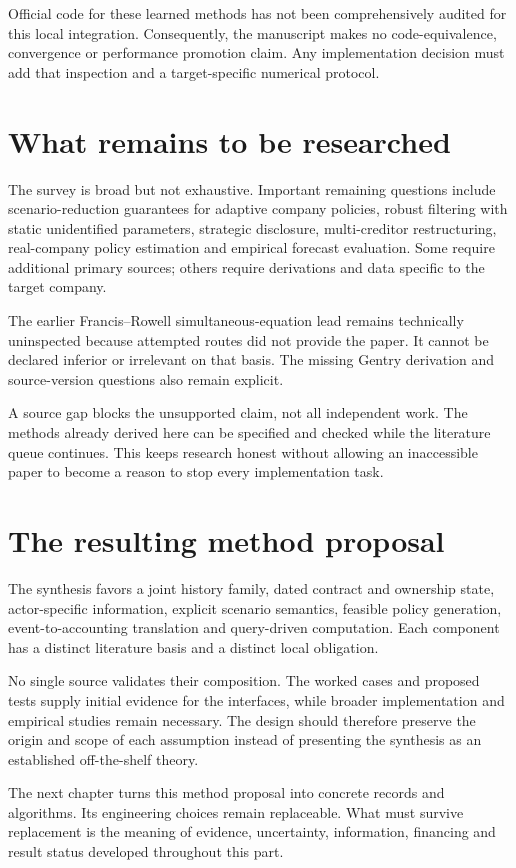 Official code for these learned methods has not been comprehensively audited for this local integration. Consequently, the manuscript makes no code-equivalence, convergence or performance promotion claim. Any implementation decision must add that inspection and a target-specific numerical protocol.



\section{What remains to be researched}
The survey is broad but not exhaustive. Important remaining questions include scenario-reduction guarantees for adaptive company policies, robust filtering with static unidentified parameters, strategic disclosure, multi-creditor restructuring, real-company policy estimation and empirical forecast evaluation. Some require additional primary sources; others require derivations and data specific to the target company.

The earlier Francis--Rowell simultaneous-equation lead remains technically uninspected because attempted routes did not provide the paper. It cannot be declared inferior or irrelevant on that basis. The missing Gentry derivation and source-version questions also remain explicit.

A source gap blocks the unsupported claim, not all independent work. The methods already derived here can be specified and checked while the literature queue continues. This keeps research honest without allowing an inaccessible paper to become a reason to stop every implementation task.

\section{The resulting method proposal}
The synthesis favors a joint history family, dated contract and ownership state, actor-specific information, explicit scenario semantics, feasible policy generation, event-to-accounting translation and query-driven computation. Each component has a distinct literature basis and a distinct local obligation.

No single source validates their composition. The worked cases and proposed tests supply initial evidence for the interfaces, while broader implementation and empirical studies remain necessary. The design should therefore preserve the origin and scope of each assumption instead of presenting the synthesis as an established off-the-shelf theory.

The next chapter turns this method proposal into concrete records and algorithms. Its engineering choices remain replaceable. What must survive replacement is the meaning of evidence, uncertainty, information, financing and result status developed throughout this part.
